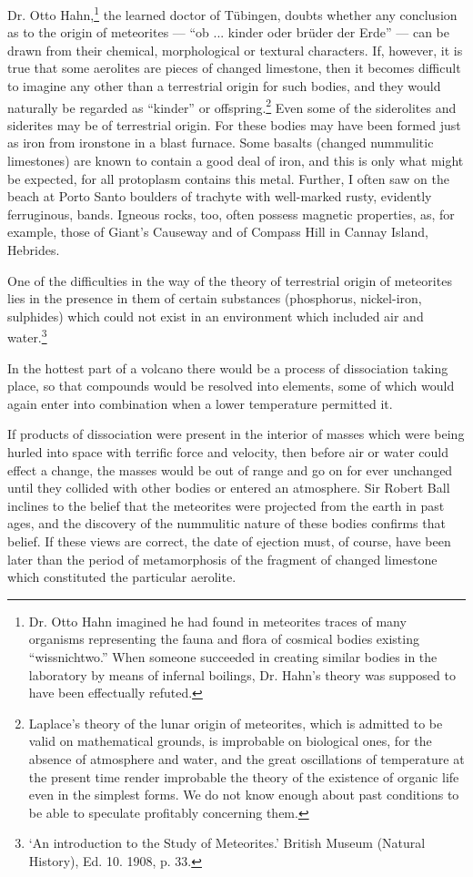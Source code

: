\documentclass[a4paper, 12pt, oneside]{article}
\begin{document}
Dr. Otto Hahn,\footnote{Dr. Otto Hahn imagined he had found in meteorites traces of many organisms representing the fauna and flora of cosmical bodies existing ``wissnichtwo.'' When someone succeeded in creating similar bodies in the laboratory by means of infernal boilings, Dr. Hahn's theory was supposed to have been effectually refuted.} the learned doctor of Tübingen, doubts whether any conclusion as to the origin of meteorites --- ``ob ... kinder oder brüder der Erde'' --- can be drawn from their chemical, morphological or textural characters. If, however, it is true that some aerolites are pieces of changed limestone, then it becomes difficult to imagine any other than a terrestrial origin for such bodies, and they would naturally be regarded as ``kinder'' or offspring.\footnote{Laplace's theory of the lunar origin of meteorites, which is admitted to be valid on mathematical grounds, is improbable on biological ones, for the absence of atmosphere and water, and the great oscillations of temperature at the present time render improbable the theory of the existence of organic life even in the simplest forms. We do not know enough about past conditions to be able to speculate profitably concerning them.} Even some of the siderolites and siderites may be of terrestrial origin. For these bodies may have been formed just as iron from ironstone in a blast furnace. Some basalts (changed nummulitic limestones) are known to contain a good deal of iron, and this is only what might be expected, for all protoplasm contains this metal. Further, I often saw on the beach at Porto Santo boulders of trachyte with well-marked rusty, evidently ferruginous, bands. Igneous rocks, too, often possess magnetic properties, as, for example, those of Giant's Causeway and of Compass Hill in Cannay Island, Hebrides.

One of the difficulties in the way of the theory of terrestrial origin of meteorites lies in the presence in them of certain substances (phosphorus, nickel-iron, sulphides) which could not exist in an environment which included air and water.\footnote{`An introduction to the Study of Meteorites.' British Museum (Natural History), Ed. 10. 1908, p. 33.}

In the hottest part of a volcano there would be a process of dissociation taking place, so that compounds would be resolved into elements, some of which would again enter into combination when a lower temperature permitted it.

If products of dissociation were present in the interior of masses which were being hurled into space with terrific force and velocity, then before air or water could effect a change, the masses would be out of range and go on for ever unchanged until they collided with other bodies or entered an atmosphere. Sir Robert Ball inclines to the belief that the meteorites were projected from the earth in past ages, and the discovery of the nummulitic nature of these bodies confirms that belief. If these views are correct, the date of ejection must, of course, have been later than the period of metamorphosis of the fragment of changed limestone which constituted the particular aerolite.
\end{document}
